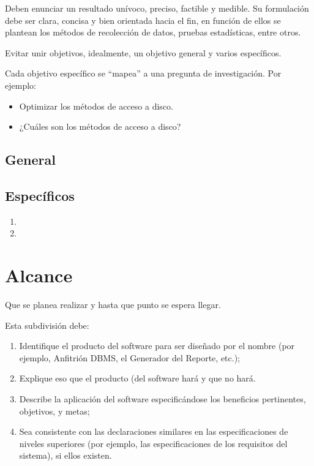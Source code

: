 Deben enunciar un resultado unívoco, preciso, factible y medible. Su formulación debe ser clara, concisa y bien orientada hacia el fin, en función de ellos se plantean los métodos de recolección de datos, pruebas estadísticas, entre otros.

Evitar unir objetivos, idealmente, un objetivo general y varios específicos.

Cada objetivo específico se ``mapea'' a una pregunta de investigación.
Por ejemplo:
  \begin{itemize}
  \item \textbf{} Optimizar los métodos de acceso a disco.
  \item \textbf{} ¿Cuáles son los métodos de acceso a disco?
\end{itemize}

\subsection{General}
\blindtext %

\subsection{Específicos}
\begin{enumerate}\justifying
  \item 
  \blindtext %

  \item 
  \blindtext %


\end{enumerate}

\section{Alcance}
Que se planea realizar y hasta que punto se espera llegar.

Esta subdivisión debe:
\begin{enumerate}\justifying
  \item Identifique el producto del software para ser diseñado por el nombre (por ejemplo, Anfitrión DBMS, el Generador del Reporte, etc.);
  \item Explique eso que el producto (del software hará y que no hará.
  \item Describe la aplicación del software especificándose los beneficios pertinentes, objetivos, y metas;
  \item Sea consistente con las declaraciones similares en las especificaciones de niveles superiores (por ejemplo, las especificaciones de los requisitos del sistema), si ellos existen.
\end{enumerate}


